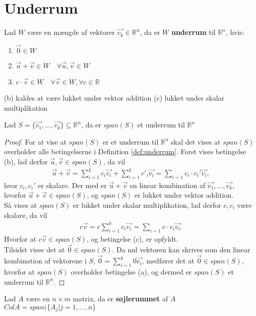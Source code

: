 \section{Underrum}
\begin{defn}
Lad $W$ være en mængde af vektorer $\vec{v_k} \in \mathds{R}^n$, da er $W$  \textbf{underrum} til $\mathds{R}^n$, hvis:
\begin{enumerate}[label=\alph*]
\item $\vec{0} \in W$
\item $\vec{u}+\vec{v} \in W \quad \forall \vec{u}, \vec{v} \in W$
\item $c \cdot \vec{v} \in W \quad \forall \vec{v} \in W, \forall c \in \mathds{R}$
\end{enumerate}
\label{def:underrum}
\end{defn}
(b) kaldes at være lukket under vektor addition (c) lukket under skalar multiplikation

\begin{stn}
Lad $S=\{\vec{v_1},...,\vec{v_k}\} \subseteq \mathds{R}^n$, da er $span(S)$ et underrum til $\mathds{R}^n$
\end{stn}
\begin{proof}
For at vise at $span(S)$ er et underrum til $\mathds{R}^n$ skal det vises at $span(S)$ overholder alle betingelserne i Definition \ref{def:underrum}.
Først vises betingelse (b), lad  derfor $\vec{u}, \vec{v} \in span(S)$, da vil 
\begin{align*}
\vec{u}+\vec{v}= \sum_{i=1}^k c_i \vec{v_i} + \sum_{i=1}^k c'_i \vec{v_i} = \sum_{i=1} c_i\cdot c_i' \vec{v_i},
\end{align*}
hvor $c_i, c_i'$ er skalare.
Der med er $\vec{u}+\vec{v}$ en linear kombination af $\vec{v_1},...,\vec{v_k}$, hvorfor $\vec{u}+\vec{v} \in span(S)$, og $span(S)$ er lukket under vektor addition.
\\ Så vises at $span(S)$ er lukket under skalar multiplikation, lad derfor $c, c_i$ være skalare, da vil
\begin{align*}
c\vec{v}= c\sum_{i=1}^k c_i \vec{v_i}  = \sum_{i=1} c \cdot c_i \vec{v_i}.
\end{align*}
Hvorfor at $c\vec{v} \in span(S)$, og betingelse (c), er opfyldt.
\\Tilsidst vises det at $\vec{0} \in span(S)$.
Da nul vektoren kan skrives som den linear kombination af vektorene i $S$, $\vec{0} = \sum_{i=1}^k 0 \vec{v_i}$, medfører det at $\vec{0} \in span(S)$, hvorfor at $span(S)$ overholder betingelse (a), og dermed er $span(S)$ et underrum til $\mathds{R}^n$.
\end{proof}

\begin{defn}
Lad $A$ være en $n\times m$ matrix, da er \textbf{søjlerummet} af $A$ $Col A = span(\{A_j | j =1,...,n\}$
\label{def:sojlerum}
\end{defn} 

